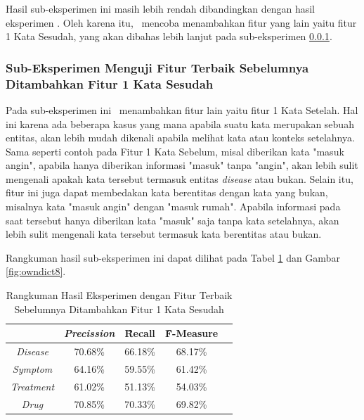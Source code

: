 	Hasil sub-eksperimen ini masih lebih rendah dibandingkan dengan hasil eksperimen \cite{skripsiKakRadit}. Oleh karena itu, \saya~mencoba menambahkan fitur yang lain yaitu fitur 1 Kata Sesudah, yang akan dibahas lebih lanjut pada sub-eksperimen \ref{eks:subekswaf1}.
	
	
	\subsubsection{Sub-Eksperimen Menguji Fitur Terbaik Sebelumnya Ditambahkan Fitur 1 Kata Sesudah}\label{eks:subekswaf1}
	Pada sub-eksperimen ini \saya~menambahkan fitur lain yaitu fitur 1 Kata Setelah. Hal ini karena ada beberapa kasus yang mana apabila suatu kata merupakan sebuah entitas, akan lebih mudah dikenali apabila melihat kata atau konteks setelahnya. Sama seperti contoh pada Fitur 1 Kata Sebelum, misal diberikan kata "masuk angin", apabila hanya diberikan informasi "masuk" tanpa "angin", akan lebih sulit mengenali apakah kata tersebut termasuk entitas \textit{disease} atau bukan. Selain itu, fitur ini juga dapat membedakan kata berentitas dengan kata yang bukan, misalnya kata "masuk angin" dengan "masuk rumah". Apabila informasi pada saat tersebut hanya diberikan kata "masuk" saja tanpa kata setelahnya, akan lebih sulit mengenali kata tersebut termasuk kata berentitas atau bukan.
	
	Rangkuman hasil sub-eksperimen ini dapat dilihat pada Tabel \ref{table:owndict8} dan Gambar \ref{fig:owndict8}.
	
	\begin{table}
		\centering
		\caption{Rangkuman Hasil Eksperimen dengan Fitur Terbaik Sebelumnya Ditambahkan Fitur 1 Kata Sesudah}
		\begin{tabular}{|c|c|c|c|c|}
			\hline
			& \textit{Precission} & \f{\f{Recall}} & \f{\f{F-Measure}} \\ \hline
			\textit{Disease}      & 70.68\%             & 66.18\%        & 68.17\%           \\ \hline
			\textit{Symptom}      & 64.16\%             & 59.55\%        & 61.42\%           \\ \hline
			\textit{Treatment}    & 61.02\%             & 51.13\%        & 54.03\%           \\ \hline
			\textit{Drug}		  & 70.85\%             & 70.33\%        & 69.82\%           \\ \hline
		\end{tabular}
		\label{table:owndict8}
	\end{table}
	
